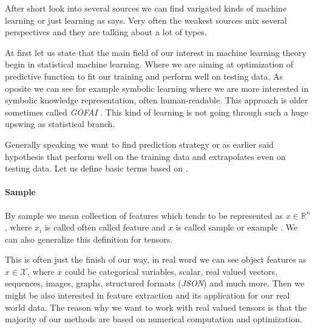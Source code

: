 After short look into several sources we can find varigated kinds of machine learning or just learning as \cite{Russell2009} says. Very often the weakest sources mix several perspectives and they are talking about a lot of types.

At first let us state that the main field of our interest in machine learning theory begin in statistical machine learning. Where we are aiming at optimization of predictive function to fit our training and perform well on testing data. As oposite we can see for example symbolic learning where we are more interested in symbolic knowledge representation, often human-readable. This approach is older sometimes called \emph{GOFAI} \cite{Haugeland1985}. This kind of learning is not going through such a huge upswing as statistical branch.

Generally speaking we want to find prediction strategy or as earlier said hypothesis that perform well on the training data and extrapolates even on testing data. Let us define basic terms based on \cite{Franc2020}.


\paragraph{Sample}
By sample we mean collection of features which tends to be represented as $x\in\mathbb{R}^{n}$, where $x_i$ is called often called feature and $x$ is called sample or example \cite{GoodBengCour16}. We can also generalize this definition for tensors.

This is often just the finish of our way, in real word we can see object features as $x \in \mathcal{X}$, where $x$ could be categorical variables, scalar, real valued vectors, sequences, images, graphs, structured formats (\emph{JSON}) and much more. Then we might be also interested in feature extraction and its application for our real world data. The reason why we want to work with real valued tensors is that the majority of our methods are based on numerical computation and optimization. 

